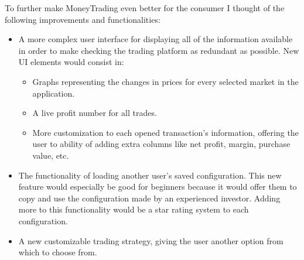 \documentclass[12pt,a4paper]{report}
\begin{document}
To further make MoneyTrading even better for the consumer I thought of the following improvements and functionalities:
\begin{itemize}
	\item A more complex user interface for displaying all of the information available in order to make checking the trading platform as redundant as possible. New UI elements would consist in:
	\begin{itemize}
		\item Graphs representing the changes in prices for every selected market in the application.
		\item A live profit number for all trades.
		\item More customization to each opened transaction's information, offering the user to ability of adding extra columns like net profit, margin, purchase value, etc.
	\end{itemize}
	\item The functionality of loading another user's saved configuration. This new feature would especially be good for beginners because it would offer them to copy and use the configuration made by an experienced investor. Adding more to this functionality would be a star rating system to each configuration.
	\item A new customizable trading strategy, giving the user another option from which to choose from.
\end{itemize}




\end{document}
